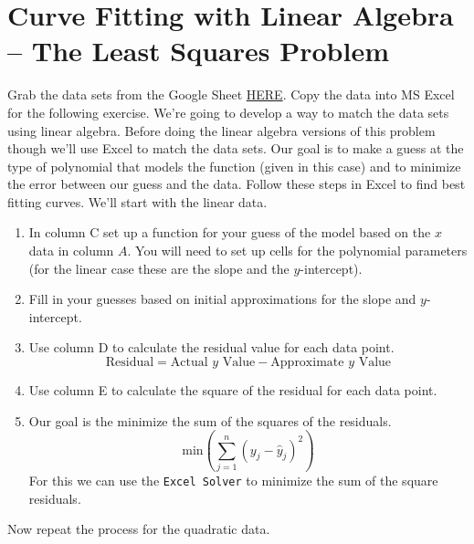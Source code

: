 \newpage\section{Curve Fitting with Linear Algebra -- The Least Squares Problem}\label{sec:least_squares}
\begin{problem}\label{prob:least_squares_1}
    Grab the data sets from the Google Sheet
    \href{https://docs.google.com/spreadsheets/d/1bpqb51eTTtJbe9V1JLt_JkzN-8kbIh2RzisRQHIMLrY/edit?usp=sharing}{HERE}.
    Copy the data into MS Excel for the following exercise.  We're going to develop a way
    to match the data sets using linear algebra.  Before doing the linear algebra versions
    of this problem though we'll use Excel to match the data sets.  Our goal is to make a
    guess at the type of polynomial that models the function (given in this case) and to
    minimize the error between our guess and the data.  Follow these steps in Excel to
    find best fitting curves.  We'll start with the linear data.
    \begin{enumerate}
        \item In column C set up a function for your guess of the model based on the $x$ data in column
            $A$.  You will need to set up cells for the polynomial parameters (for the
            linear case these are the slope and the $y$-intercept).
        \item Fill in your guesses based on initial approximations for the slope and
            $y$-intercept.
        \item Use column D to calculate the residual value for each data point.
            \[ \text{Residual} = \text{Actual $y$ Value} - \text{Approximate $y$ Value} \]
        \item Use column E to calculate the square of the residual for each data point.
        \item Our goal is the minimize the sum of the squares of the residuals.
            \[ \text{min} \left( \sum_{j=1}^n \left( y_j - \hat{y}_j \right)^2 \right) \]
            For this we can use the \texttt{Excel Solver} to minimize the sum of the
            square residuals.
    \end{enumerate}
    Now repeat the process for the quadratic data.
\end{problem}




